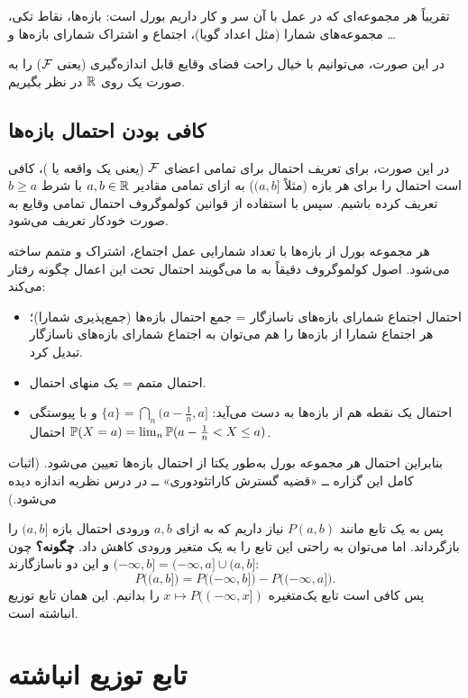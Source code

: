 تقریباً هر مجموعه‌ای که در عمل با آن سر و کار داریم بورل است: بازه‌ها، نقاط تکی، مجموعه‌های شمارا (مثل اعداد گویا)، اجتماع و اشتراک شمارای بازه‌ها و \ldots

در این صورت، می‌توانیم با خیال راحت فضای وقایع قابل اندازه‌گیری (یعنی $\mathcal{F}$) را به صورت یک  روی $\mathbb{R}$ در نظر بگیریم.

\subsection{کافی بودن احتمال بازه‌ها}
در این صورت، برای تعریف احتمال برای تمامی اعضای $\mathcal{F}$ (یعنی یک واقعه یا )، کافی است احتمال را برای هر بازه (مثلاً $(a,b]$) به ازای تمامی مقادیر $a,b\in\mathbb{R}$ با شرط $b\ge a$ تعریف کرده باشیم. سپس با استفاده از قوانین کولموگروف احتمال تمامی وقایع به صورت خودکار تعریف می‌شود.

\begin{question}[چرا؟]
\begin{answer}
هر مجموعه بورل از بازه‌ها با تعداد شمارایی عمل اجتماع، اشتراک و متمم ساخته می‌شود. اصول کولموگروف دقیقاً به ما می‌گویند احتمال تحت این اعمال چگونه رفتار می‌کند:
\begin{itemize}
\item احتمال اجتماع شمارای بازه‌های ناسازگار = جمع احتمال بازه‌ها (جمع‌پذیری شمارا)؛ هر اجتماع شمارا از بازه‌ها را هم می‌توان به اجتماع شمارای بازه‌های ناسازگار تبدیل کرد.
\item احتمال متمم = یک منهای احتمال.
\item احتمال یک نقطه هم از بازه‌ها به دست می‌آید: $\{a\}=\bigcap_{n}(a-\frac1n,a]$ و با پیوستگی احتمال $\mathbb{P}(X=a)=\lim_n\mathbb{P}(a-\frac1n<X\le a)$.
\end{itemize}
بنابراین احتمال هر مجموعه بورل به‌طور یکتا از احتمال بازه‌ها تعیین می‌شود. (اثبات کامل این گزاره ــ «قضیه گسترش کاراتئودوری» ــ در درس نظریه اندازه دیده می‌شود.)
\end{answer}
\end{question}

پس به یک تابع مانند $P(a,b)$ نیاز داریم که به ازای $a,b$ ورودی احتمال بازه $(a,b]$ را بازگرداند. اما می‌توان به راحتی این تابع را به یک متغیر ورودی کاهش داد. \textbf{چگونه؟} چون $(-\infty,b]=(-\infty,a]\cup(a,b]$ و این دو ناسازگارند:
\[
P\big((a,b]\big)=P\big((-\infty,b]\big)-P\big((-\infty,a]\big).
\]
پس کافی است تابع یک‌متغیره $x\mapsto P((-\infty,x])$ را بدانیم. این همان تابع توزیع انباشته است.

\section{تابع توزیع انباشته }

